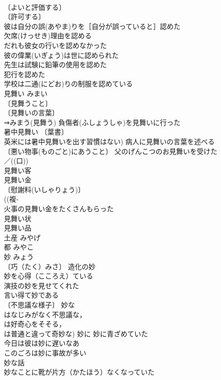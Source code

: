 \documentclass[8pt]{extreport}
\begin{document}
\begin{CJK}{UTF8}{min}
\\	〔よいと評価する〕
\\	〔許可する〕
\\	彼は自分の誤(あやま)りを［自分が誤っていると］認めた 
\\	欠席(けっせき)理由を認める 
\\	だれも彼女の行いを認めなかった 
\\	彼の偉業(いぎょう)は世に認められた 
\\	先生は試験に鉛筆の使用を認めた 
\\	犯行を認めた 
\\	学校は二通(にどお)りの制服を認めている 
\\	見舞い	みまい	
\\	〔見舞うこと〕
\\	〔見舞いの言葉〕
\\	⇒みまう(見舞う) 負傷者(ふしょうしゃ)を見舞いに行った 
\\	暑中見舞い 〔葉書〕
\\	英米には暑中見舞いを出す習慣はない) 病人に見舞いの言葉を述べる 
\\	〔悪い物事(ものごと)にあうこと〕 父のげんこつのお見舞いを受けた 
\\	／((口)) 
\\	見舞い客 
\\	見舞い金 
\\	〔慰謝料(いしゃりょう)〕
\\	((複-
\\	火事の見舞い金をたくさんもらった 
\\	見舞い状 
\\	見舞い品 
\\	土産	みやげ	
\\	都	みやこ	
\\	妙	みょう	
\\	〔巧（たく）みさ〕 造化の妙 
\\	妙を心得（こころえ）ている 
\\	演技の妙を見せてくれた 
\\	言い得て妙である 
\\	〔不思議な様子〕 妙な 
\\	はなじみがなく不思議な，
\\	は好奇心をそそる，
\\	は普通と違って奇妙な) 妙に 妙に青ざめていた 
\\	今日は彼は妙に遅いなあ 
\\	このごろは妙に事故が多い 
\\	妙な話 
\\	妙なことに靴が片方（かたほう）なくなっていた 

\end{CJK}
\end{document}
